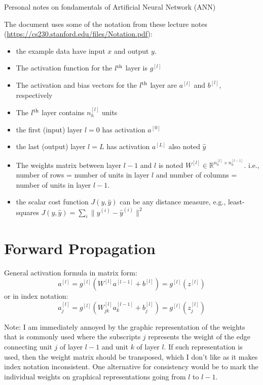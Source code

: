 \documentclass[letterpaper,12pt,oneside]{article}
\begin{document}
\begin{center}
Personal notes on fondamentals of Artificial Neural Network (ANN)
\end{center}

The document uses some of the notation from these lecture notes (\href{https://cs230.stanford.edu/files/Notation.pdf}{https://cs230.stanford.edu/files/Notation.pdf}):

\begin{itemize}
\item the example data have input $x$ and output $y$.
\item The activation function for the $l^{\rm th}$ layer is $g^{[l]}$
\item The activation and bias vectors for the $l^{\rm th}$ layer are $a^{[l]}$ and $b^{[l]}$, respectively
\item The $l^{\rm th}$ layer contains $n_h^{[l]}$ units
\item the first (input) layer $l=0$ has activation $a^{[0]}$
\item the last (output) layer $l=L$ has activation $a^{[L]}$ also noted $\hat{y}$
\item The weights matrix between layer $l-1$ and $l$ is noted $W^{[l]} \in \mathbb{R}^{n_h^{[l]}\times n_h^{[l-1]}}$. i.e., number of rows = number of units in layer $l$ and number of columns = number of units in layer $l-1$.
\item the scalar cost function $J(y, \hat{y})$ can be any distance measure, e.g., least-squares $J(y, \hat{y}) = \sum_i \|y^{(i)} - \hat{y}^{(i)} \|^2$
\end{itemize}

\section{Forward Propagation}
General activation formula in matrix form:
\begin{equation}
a^{[l]} = g^{[l]} \left( W^{[l]} a^{[l-1]} + b^{[l]} \right) = g^{[l]} (z^{[l]})
\end{equation}
or in index notation:
\begin{equation}
a_j^{[l]} = g^{[l]} \left( W_{jk}^{[l]} a_k^{[l-1]} + b_j^{[l]} \right) = g^{[l]} (z_j^{[l]})
\end{equation}

Note: I am immediately annoyed by the graphic representation of the weights that is commonly used where the subscripts $j$ represents the weight of the edge connecting unit $j$ of layer $l-1$ and unit $k$ of layer $l$. If such representation is used, then the weight matrix should be transposed, which I don't like as it makes index notation inconsistent. One alternative for consistency would be to mark the individual weights on graphical representations going from $l$ to $l-1$.
\end{document}
